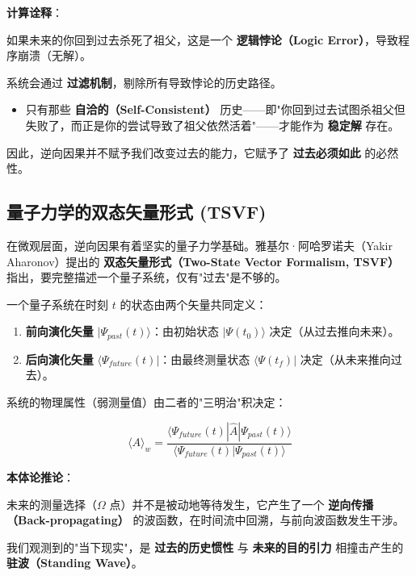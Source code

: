 \textbf{计算诠释}：

如果未来的你回到过去杀死了祖父，这是一个 \textbf{逻辑悖论（Logic Error）}，导致程序崩溃（无解）。

系统会通过 \textbf{过滤机制}，剔除所有导致悖论的历史路径。

\begin{itemize}
\item 只有那些 \textbf{自洽的（Self-Consistent）} 历史——即"你回到过去试图杀祖父但失败了，而正是你的尝试导致了祖父依然活着"——才能作为 \textbf{稳定解} 存在。
\end{itemize}

因此，逆向因果并不赋予我们改变过去的能力，它赋予了 \textbf{过去必须如此} 的必然性。

\subsection{量子力学的双态矢量形式 (TSVF)}

在微观层面，逆向因果有着坚实的量子力学基础。雅基尔·阿哈罗诺夫（Yakir Aharonov）提出的 \textbf{双态矢量形式（Two-State Vector Formalism, TSVF）} 指出，要完整描述一个量子系统，仅有"过去"是不够的。

一个量子系统在时刻 $t$ 的状态由两个矢量共同定义：

\begin{enumerate}
\item \textbf{前向演化矢量} $|\Psi_{past}(t)\rangle$：由初始状态 $|\Psi(t_0)\rangle$ 决定（从过去推向未来）。

\item \textbf{后向演化矢量} $\langle \Psi_{future}(t)|$：由最终测量状态 $\langle \Psi(t_f)|$ 决定（从未来推向过去）。
\end{enumerate}

系统的物理属性（弱测量值）由二者的"三明治"积决定：

\begin{equation}
\langle A \rangle_w = \frac{\langle \Psi_{future}(t) | \hat{A} | \Psi_{past}(t) \rangle}{\langle \Psi_{future}(t) | \Psi_{past}(t) \rangle}
\end{equation}

\textbf{本体论推论}：

未来的测量选择（$\Omega$ 点）并不是被动地等待发生，它产生了一个 \textbf{逆向传播（Back-propagating）} 的波函数，在时间流中回溯，与前向波函数发生干涉。

我们观测到的"当下现实"，是 \textbf{过去的历史惯性} 与 \textbf{未来的目的引力} 相撞击产生的 \textbf{驻波（Standing Wave）}。

